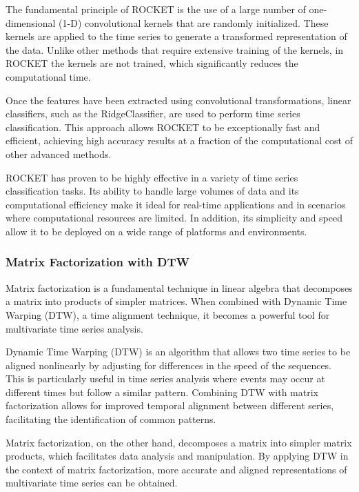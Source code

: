 The fundamental principle of ROCKET is the use of a large number of one-dimensional (1-D) convolutional kernels that are randomly initialized. These kernels are applied to the time series to generate a transformed representation of the data. Unlike other methods that require extensive training of the kernels, in ROCKET the kernels are not trained, which significantly reduces the computational time.

Once the features have been extracted using convolutional transformations, linear classifiers, such as the RidgeClassifier, are used to perform time series classification. This approach allows ROCKET to be exceptionally fast and efficient, achieving high accuracy results at a fraction of the computational cost of other advanced methods.

ROCKET has proven to be highly effective in a variety of time series classification tasks. Its ability to handle large volumes of data and its computational efficiency make it ideal for real-time applications and in scenarios where computational resources are limited. In addition, its simplicity and speed allow it to be deployed on a wide range of platforms and environments.
\vspace{10pt}

\subsubsection{Matrix Factorization with DTW}
Matrix factorization is a fundamental technique in linear algebra that decomposes a matrix into products of simpler matrices. When combined with Dynamic Time Warping (DTW), a time alignment technique, it becomes a powerful tool for multivariate time series analysis.

Dynamic Time Warping (DTW)\cite{bringmann2023dynamicdynamictimewarping} is an algorithm that allows two time series to be aligned nonlinearly by adjusting for differences in the speed of the sequences. This is particularly useful in time series analysis where events may occur at different times but follow a similar pattern. Combining DTW with matrix factorization allows for improved temporal alignment between different series, facilitating the identification of common patterns.

Matrix factorization, on the other hand, decomposes a matrix into simpler matrix products, which facilitates data analysis and manipulation. By applying DTW in the context of matrix factorization, more accurate and aligned representations of multivariate time series can be obtained.

